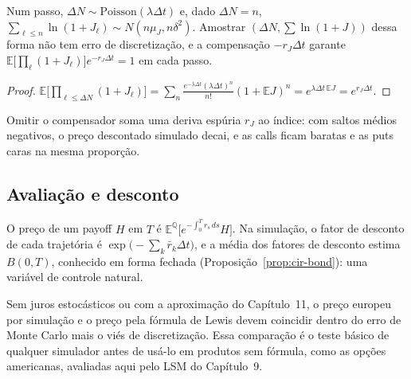 \begin{proposicao}
Num passo, $\Delta N\sim\mathrm{Poisson}(\lambda\Delta t)$ e, dado $\Delta N=n$, $\sum_{\ell\le n}\ln(1+J_\ell)\sim N(n\mu_J,n\delta^2)$. Amostrar $(\Delta N,\sum\ln(1+J))$ dessa forma não tem erro de discretização, e a compensação $-r_J\Delta t$ garante $\mathbb E\big[\prod_\ell(1+J_\ell)\big]e^{-r_J\Delta t}=1$ em cada passo.
\end{proposicao}

\begin{proof}
$\mathbb E\big[\prod_{\ell\le\Delta N}(1+J_\ell)\big]=\sum_n\frac{e^{-\lambda\Delta t}(\lambda\Delta t)^n}{n!}(1+\mathbb EJ)^n=e^{\lambda\Delta t\,\mathbb EJ}=e^{r_J\Delta t}$.
\end{proof}

Omitir o compensador soma uma deriva espúria $r_J$ ao índice: com saltos médios negativos, o preço descontado simulado decai, e as calls ficam baratas e as puts caras na mesma proporção.

\subsection{Avaliação e desconto}

\begin{proposicao}
O preço de um payoff $H$ em $T$ é $\mathbb E^{\mathbb Q}\big[e^{-\int_0^Tr_s\,ds}H\big]$. Na simulação, o fator de desconto de cada trajetória é $\exp\big(-\sum_k\bar r_k\Delta t\big)$, e a média dos fatores de desconto estima $B(0,T)$, conhecido em forma fechada (Proposição~\ref{prop:cir-bond}): uma variável de controle natural.
\end{proposicao}

\begin{observacao}
Sem juros estocásticos ou com a aproximação do Capítulo~11, o preço europeu por simulação e o preço pela fórmula de Lewis devem coincidir dentro do erro de Monte Carlo mais o viés de discretização. Essa comparação é o teste básico de qualquer simulador antes de usá-lo em produtos sem fórmula, como as opções americanas, avaliadas aqui pelo LSM do Capítulo~9.
\end{observacao}
